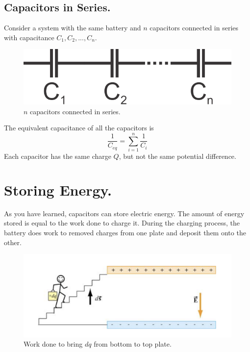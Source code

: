 \documentclass[11pt, letterpaper]{article}
\begin{document}
\subsection{Capacitors in Series.}
Consider a system with the same battery and $n$ capacitors connected in series with capacitance $C_1, C_2,...,C_n$.
\begin{figure}[h!]
	\centering
	\includegraphics[scale=0.2]{series.png}
	\caption{$n$ capacitors connected in series.}
\end{figure}

The equivalent capacitance of all the capacitors is 
\begin{equation}\label{eqn:series}
	\boxed{\frac{1}{C_{eq}} = \sum_{i = 1}^{n}\frac{1}{C_i}}
\end{equation}
Each capacitor has the same charge $Q$, but not the same potential difference.

\section{Storing Energy.}
As you have learned, capacitors can store electric energy. The amount of energy stored is equal to the work done to charge it. During the charging process, the battery does work to removed charges from one plate and deposit them onto the other. 
\begin{figure}[h!]
	\centering
	\includegraphics[scale=0.5]{man.png}
	\caption{Work done to bring $dq$ from bottom to top plate.}
	\label{fig:man}
\end{figure}
\end{document}
